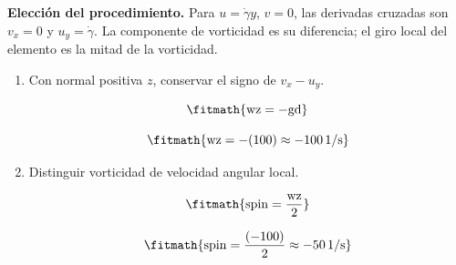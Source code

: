 \noindent\textbf{Elección del procedimiento.} Para $u=\dot\gamma y$, $v=0$, las derivadas cruzadas son $v_x=0$ y $u_y=\dot\gamma$. La componente de vorticidad es su diferencia; el giro local del elemento es la mitad de la vorticidad.

\begin{enumerate}

\item Con normal positiva $z$, conservar el signo de $v_x-u_y$.

\[\fitmath{\mathrm{wz}=-\mathrm{gd}}\]

\[\fitmath{\mathrm{wz}=-(100)\approx -100\,\mathrm{1/s}}\]

\item Distinguir vorticidad de velocidad angular local.

\[\fitmath{\mathrm{spin}=\frac{\mathrm{wz}}{2}}\]

\[\fitmath{\mathrm{spin}=\frac{(-100)}{2}\approx -50\,\mathrm{1/s}}\]

\end{enumerate}
